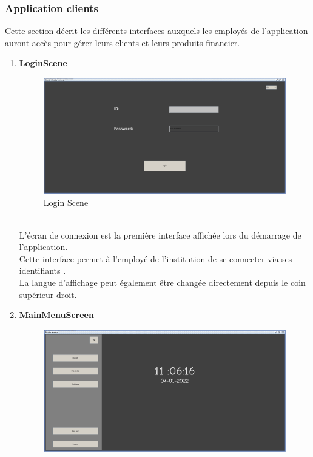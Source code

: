 \documentclass[../rapport.tex]{subfiles}
\begin{document}
\subsubsection{Application clients}
Cette section décrit les différents interfaces auxquels les employés de l'application auront accès pour gérer leurs clients et leurs produits financier.\\

\begin{enumerate}
    \item \textbf{LoginScene} \\
            \begin{figure}[h!]
                    \centering \includegraphics[scale=0.2]{ressources/photos_diagrammes/app2/gui/loginScene.jpg}
                    \caption{Login Scene}
            \end{figure}
            \\
L'écran de connexion est la première interface affichée lors du démarrage de l'application.\\
Cette interface permet à l'employé de l'institution de se connecter via ses identifiants .\\
La langue d'affichage peut également être changée directement depuis le coin supérieur droit.
\newpage
\item \textbf{MainMenuScreen} \\
		\begin{figure}[h!]
				\centering \includegraphics[scale=0.2]{ressources/photos_diagrammes/app2/gui/mainMenuScene.jpg}

\end{figure}
\end{enumerate}
\end{document}
